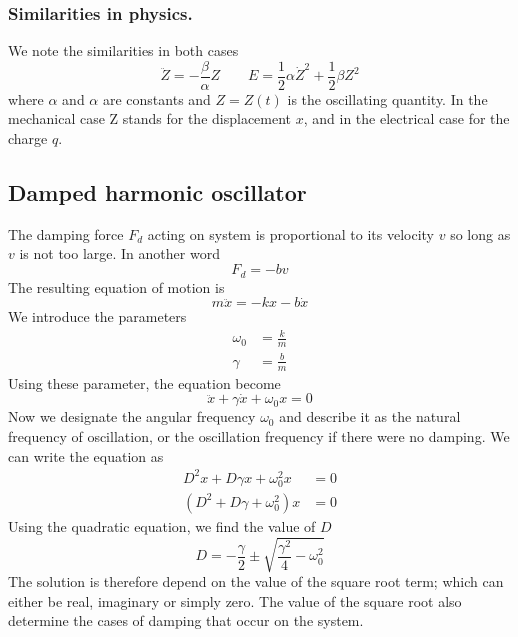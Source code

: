 \documentclass[../../../main.tex]{subfiles}
\begin{document}
\subsubsection{Similarities in physics.} We note the similarities in both cases 
\begin{equation*}
    \ddot{Z}=-\frac{\beta}{\alpha}Z\qquad E=\frac{1}{2}\alpha\dot{Z}^2+\frac{1}{2}\beta Z^2
\end{equation*}
where $\alpha$ and $\alpha$ are constants and $Z = Z(t)$ is the oscillating quantity. In the mechanical case Z stands for the displacement $x$, and in the electrical case for the charge $q$.

\subsection{Damped harmonic oscillator} 
The damping force $F_d$ acting on system is proportional to its velocity $v$ so long as $v$ is not too large. In another word
\begin{equation*}
    F_d=-bv
\end{equation*}
The resulting equation of motion is
\begin{equation*}
    m\ddot{x}=-kx-b\dot{x}
\end{equation*}
We introduce the parameters
\begin{align*}
    \omega_0&=\frac{k}{m}\\
    \gamma&=\frac{b}{m}
\end{align*}
Using these parameter, the equation become
\begin{equation*}
    \ddot{x}+\gamma\dot{x}+\omega_0 x=0
\end{equation*}
Now we designate the angular frequency $\omega_0$ and describe it as the natural frequency of oscillation, or the oscillation frequency if there were no damping. We can write the equation as\begin{align*}
    D^2x+D\gamma x+\omega_0^2x&=0\\
    (D^2+D\gamma +\omega_0^2)x&=0
\end{align*}
Using the quadratic equation, we find the value of $D$
\begin{equation*}
    D=-\frac{\gamma}{2}\pm \sqrt{\frac{\gamma^2}{4}-\omega_0^2}
\end{equation*}
The solution is therefore depend on the value of the square root term; which can either be real, imaginary or simply zero. The value of the square root also determine the cases of damping that occur on the system. 
\end{document}
